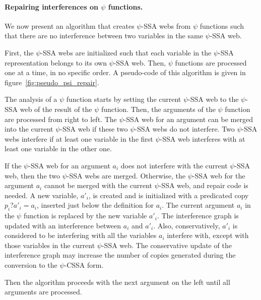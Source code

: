 \paragraph{Repairing interferences on $\psi$ functions.}
We now present an algorithm that creates $\psi$-SSA webs from $\psi$
functions such that there are no interference between two variables in
the same $\psi$-SSA web.

First, the $\psi$-SSA webs are initialized such that each variable in
the $\psi$-SSA representation belongs to its own $\psi$-SSA web. Then,
$\psi$ functions are processed one at a time, in no specific order. A
pseudo-code of this algorithm is given in
figure~\ref{fig:pseudo_psi_repair}.

The analysis of a $\psi$ function starts by setting the current
$\psi$-SSA web to the $\psi$-SSA web of the result of the $\psi$
function. Then, the arguments of the $\psi$ function are processed
from right to left. The $\psi$-SSA web for an argument can be merged
into the current $\psi$-SSA web if these two $\psi$-SSA webs do not
interfere. Two $\psi$-SSA webs interfere if at least one variable in
the first $\psi$-SSA web interferes with at least one variable in the
other one.

If the $\psi$-SSA web for an argument ${a_i}$ does not interfere
with the current $\psi$-SSA web, then the two $\psi$-SSA webs are
merged. Otherwise, the $\psi$-SSA web for the argument ${a_i}$
cannot be merged with the current $\psi$-SSA web, and repair code is
needed. A new variable, ${a'_i}$, is created and is initialized
with a predicated copy ${p_i? a'_i = a_i}$, inserted just below
the definition for ${a_i}$. The current argument ${a_i}$ in
the $\psi$ function is replaced by the new variable ${a'_i}$. The
interference graph is updated with an interference between ${a_i}$
and ${a'_i}$. Also, conservatively, ${a'_i}$ is considered to
be interfering with all the variables ${a_i}$ interfere with,
except with those variables in the current $\psi$-SSA web. The
conservative update of the interference graph may increase the number
of copies generated during the conversion to the $\psi$-CSSA form.

Then the algorithm proceeds with the next argument on the left until
all arguments are processed.

